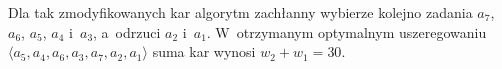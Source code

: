 
\exercise %
Dla tak zmodyfikowanych kar algorytm zachłanny wybierze kolejno zadania $a_7$, $a_6$, $a_5$, $a_4$ i~$a_3$, a~odrzuci $a_2$ i~$a_1$.
W~otrzymanym optymalnym uszeregowaniu $\langle a_5,a_4,a_6,a_3,a_7,a_2,a_1\rangle$ suma kar wynosi $w_2+w_1=30$.

\exercise %
